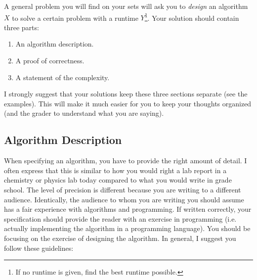 \documentclass[11pt]{article}
\theoremstyle{plain}
\theoremstyle{definition}
\numberwithin{equation}{section}
\numberwithin{figure}{section}
\begin{document}
\noindent A general problem you will find on your sets will ask you to \emph{design} an algorithm $X$ to solve a certain problem with a runtime $Y$\footnote{If no runtime is given, find the best runtime possible.}. Your solution should contain three parts:
\begin{enumerate}
\item An algorithm description.
\item A proof of correctness.
\item A statement of the complexity.
\end{enumerate}
I strongly suggest that your solutions keep these three sections separate (see the examples). This will make it much easier for you to keep your thoughts organized (and the grader to understand what you are saying).

\subsection{Algorithm Description}
When specifying an algorithm, you have to provide the right amount of detail. I often express that this is similar to how you would right a lab report in a chemistry or physics lab today compared to what you would write in grade school. The level of precision is different because you are writing to a different audience. Identically, the audience to whom you are writing you should assume has a fair experience with algorithms and programming. If written correctly, your specification should provide the reader with an exercise in programming (i.e. actually implementing the algorithm in a programming language). You should be focusing on the exercise of designing the algorithm. In general, I suggest you follow these guidelines:
\end{document}

